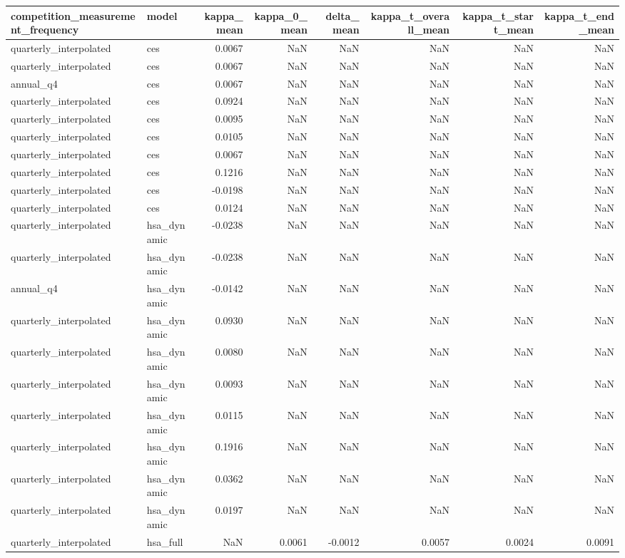 \begin{tabular}{llrrrrrr}
\toprule
competition\_measurement\_frequency & model & kappa\_mean & kappa\_0\_mean & delta\_mean & kappa\_t\_overall\_mean & kappa\_t\_start\_mean & kappa\_t\_end\_mean \\
\midrule
quarterly\_interpolated & ces & 0.0067 & NaN & NaN & NaN & NaN & NaN \\
quarterly\_interpolated & ces & 0.0067 & NaN & NaN & NaN & NaN & NaN \\
annual\_q4 & ces & 0.0067 & NaN & NaN & NaN & NaN & NaN \\
quarterly\_interpolated & ces & 0.0924 & NaN & NaN & NaN & NaN & NaN \\
quarterly\_interpolated & ces & 0.0095 & NaN & NaN & NaN & NaN & NaN \\
quarterly\_interpolated & ces & 0.0105 & NaN & NaN & NaN & NaN & NaN \\
quarterly\_interpolated & ces & 0.0067 & NaN & NaN & NaN & NaN & NaN \\
quarterly\_interpolated & ces & 0.1216 & NaN & NaN & NaN & NaN & NaN \\
quarterly\_interpolated & ces & -0.0198 & NaN & NaN & NaN & NaN & NaN \\
quarterly\_interpolated & ces & 0.0124 & NaN & NaN & NaN & NaN & NaN \\
quarterly\_interpolated & hsa\_dynamic & -0.0238 & NaN & NaN & NaN & NaN & NaN \\
quarterly\_interpolated & hsa\_dynamic & -0.0238 & NaN & NaN & NaN & NaN & NaN \\
annual\_q4 & hsa\_dynamic & -0.0142 & NaN & NaN & NaN & NaN & NaN \\
quarterly\_interpolated & hsa\_dynamic & 0.0930 & NaN & NaN & NaN & NaN & NaN \\
quarterly\_interpolated & hsa\_dynamic & 0.0080 & NaN & NaN & NaN & NaN & NaN \\
quarterly\_interpolated & hsa\_dynamic & 0.0093 & NaN & NaN & NaN & NaN & NaN \\
quarterly\_interpolated & hsa\_dynamic & 0.0115 & NaN & NaN & NaN & NaN & NaN \\
quarterly\_interpolated & hsa\_dynamic & 0.1916 & NaN & NaN & NaN & NaN & NaN \\
quarterly\_interpolated & hsa\_dynamic & 0.0362 & NaN & NaN & NaN & NaN & NaN \\
quarterly\_interpolated & hsa\_dynamic & 0.0197 & NaN & NaN & NaN & NaN & NaN \\
quarterly\_interpolated & hsa\_full & NaN & 0.0061 & -0.0012 & 0.0057 & 0.0024 & 0.0091 \\

\end{tabular}
